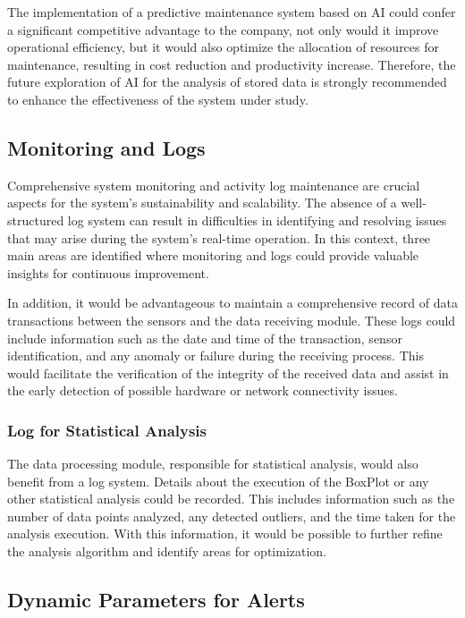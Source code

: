 The implementation of a predictive maintenance system based on \gls{AI} could confer a significant competitive advantage to the company, not only would it improve operational efficiency, but it would also optimize the allocation of resources for maintenance, resulting in cost reduction and productivity increase. Therefore, the future exploration of \gls{AI} for the analysis of stored data is strongly recommended to enhance the effectiveness of the system under study.

\subsection{Monitoring and Logs}

Comprehensive system monitoring and activity log maintenance are crucial aspects for the system's sustainability and scalability. The absence of a well-structured log system can result in difficulties in identifying and resolving issues that may arise during the system's real-time operation. In this context, three main areas are identified where monitoring and logs could provide valuable insights for continuous improvement.

In addition, it would be advantageous to maintain a comprehensive record of data transactions between the sensors and the data receiving module. These logs could include information such as the date and time of the transaction, sensor identification, and any anomaly or failure during the receiving process. This would facilitate the verification of the integrity of the received data and assist in the early detection of possible hardware or network connectivity issues.

\subsubsection{Log for Statistical Analysis}\label{subsubsec:futurelogs}

The data processing module, responsible for statistical analysis, would also benefit from a log system. Details about the execution of the BoxPlot or any other statistical analysis could be recorded. This includes information such as the number of data points analyzed, any detected outliers, and the time taken for the analysis execution. With this information, it would be possible to further refine the analysis algorithm and identify areas for optimization.

\subsection{Dynamic Parameters for Alerts}

